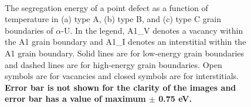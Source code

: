 \documentclass[review]{elsarticle}
\providecommand{\DIFaddtex}[1]{{\bf #1}} %
\providecommand{\DIFaddFL}[1]{\DIFadd{#1}} %
\providecommand{\DIFaddbeginFL}{} %
\providecommand{\DIFaddendFL}{} %
\providecommand{\DIFdelbeginFL}{} %
\providecommand{\DIFdelendFL}{} %
\providecommand{\DIFadd}[1]{\texorpdfstring{\DIFaddtex{#1}}{#1}} %
\newcommand{\DIFscaledelfig}{0.5}
\newlength{\DIFdelgraphicswidth} %
\newlength{\DIFdelgraphicsheight} %
\newcommand{\DIFaddincludegraphics}[2][]{{\color{blue}\fbox{\DIFOincludegraphics[#1]{#2}}}} %
\newcommand{\DIFdelincludegraphics}[2][]{%
\sbox{\DIFdelgraphicsbox}{\DIFOincludegraphics[#1]{#2}}%
\settoboxwidth{\DIFdelgraphicswidth}{\DIFdelgraphicsbox} %
\settoboxtotalheight{\DIFdelgraphicsheight}{\DIFdelgraphicsbox} %
\scalebox{\DIFscaledelfig}{%
\parbox[b]{\DIFdelgraphicswidth}{\usebox{\DIFdelgraphicsbox}\\[-\baselineskip] \rule{\DIFdelgraphicswidth}{0em}}\llap{\resizebox{\DIFdelgraphicswidth}{\DIFdelgraphicsheight}{%
\setlength{\unitlength}{\DIFdelgraphicswidth}%
\begin{picture}(1,1)%
\thicklines\linethickness{2pt} %
{\color[rgb]{1,0,0}\put(0,0){\framebox(1,1){}}}%
{\color[rgb]{1,0,0}\put(0,0){\line( 1,1){1}}}%
{\color[rgb]{1,0,0}\put(0,1){\line(1,-1){1}}}%
\end{picture}%
}\hspace*{3pt}}} %
} %
\DeclareRobustCommand{\DIFaddbeginFL}{\DIFOaddbeginFL \let\includegraphics\DIFaddincludegraphics} %
\DeclareRobustCommand{\DIFaddendFL}{\DIFOaddendFL \let\includegraphics\DIFOincludegraphics} %
\DeclareRobustCommand{\DIFdelbeginFL}{\DIFOdelbeginFL \let\includegraphics\DIFdelincludegraphics} %
\DeclareRobustCommand{\DIFdelendFL}{\DIFOaddendFL \let\includegraphics\DIFOincludegraphics} %
\begin{document}
\begin{figure}[h!]
\centering
\DIFdelbeginFL %
\DIFdelendFL \DIFaddbeginFL {}
\DIFaddendFL \\
\caption{The segregation energy of a point defect as a function of temperature in (a) type A, (b) type B, and (c) type C grain boundaries of $\alpha$-U. In the legend, A1\_V denotes a vacancy within the A1 grain boundary and A1\_I denotes an interstitial within the A1 grain boundary. Solid lines are for low-energy grain boundaries and dashed lines are for high-energy grain boundaries. Open symbols are for vacancies and closed symbols are for interstitials. \DIFaddbeginFL \DIFaddFL{Error bar is not shown for the clarity of the images and error bar has a value of  maximum $\pm$ 0.75 eV.}\DIFaddendFL }
\label{fig:Seg}
\end{figure}
\end{document}
